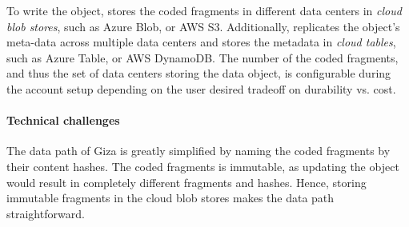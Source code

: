To write the object,
{\name} stores the coded fragments in different data centers in {\em cloud blob stores},
such as Azure Blob, or AWS S3.
Additionally, \name replicates the object's meta-data across multiple data centers 
and stores the metadata in {\em cloud tables}, such as Azure Table, or AWS DynamoDB. 
The number of the coded fragments, and thus the set of data centers
storing the data object, is configurable during the account setup depending on the user desired tradeoff on
durability vs. cost.

%


\paragraph{Technical challenges}
The data path of Giza is greatly simplified by naming the coded fragments by their content hashes.
The coded fragments is immutable, as updating the object would result in completely different fragments and hashes.
Hence, storing immutable fragments in the cloud blob stores makes the data path straightforward.

